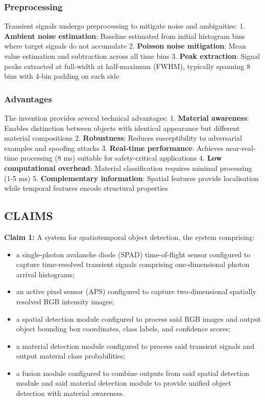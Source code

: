 \documentclass[11pt,a4paper]{article}
\begin{document}
\begin{enumerate}[leftmargin=*,label=\alph*)]
\subsubsection{Preprocessing}

Transient signals undergo preprocessing to mitigate noise and ambiguities:
1. \textbf{Ambient noise estimation}: Baseline estimated from initial histogram bins where target signals do not accumulate
2. \textbf{Poisson noise mitigation}: Mean value estimation and subtraction across all time bins
3. \textbf{Peak extraction}: Signal peaks extracted at full-width at half-maximum (FWHM), typically spanning 8 bins with 4-bin padding on each side

\subsubsection{Advantages}

The invention provides several technical advantages:
1. \textbf{Material awareness}: Enables distinction between objects with identical appearance but different material compositions
2. \textbf{Robustness}: Reduces susceptibility to adversarial examples and spoofing attacks
3. \textbf{Real-time performance}: Achieves near-real-time processing (8 ms) suitable for safety-critical applications
4. \textbf{Low computational overhead}: Material classification requires minimal processing (1-5 ms)
5. \textbf{Complementary information}: Spatial features provide localisation while temporal features encode structural properties

\vspace{0.5em}
\subsection{CLAIMS}

\textbf{Claim 1:} A system for spatiotemporal object detection, the system comprising:
\begin{itemize}[leftmargin=*]
\item a single-photon avalanche diode (SPAD) time-of-flight sensor configured to capture time-resolved transient signals comprising one-dimensional photon arrival histograms;
\item an active pixel sensor (APS) configured to capture two-dimensional spatially resolved RGB intensity images;
\item a spatial detection module configured to process said RGB images and output object bounding box coordinates, class labels, and confidence scores;
\item a material detection module configured to process said transient signals and output material class probabilities;
\item a fusion module configured to combine outputs from said spatial detection module and said material detection module to provide unified object detection with material awareness.
\end{itemize}


\end{enumerate}
\end{document}
